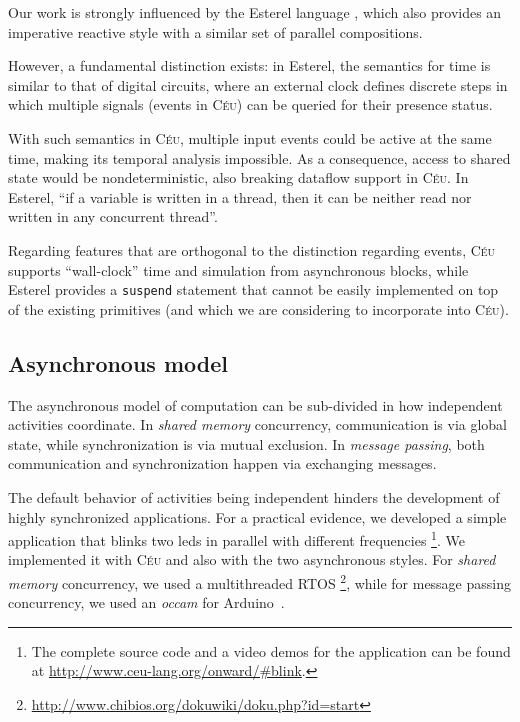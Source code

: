 \documentclass{sigplan-proc}
\newcommand{\2}{\;\;}
\newcommand{\5}{\;\;\;\;\;}
\newcommand{\CEU}{\textsc{C\'{e}u}}
\newcommand{\code}[1] {{\small{\texttt{#1}}}}
\begin{document}
Our work is strongly influenced by the Esterel language \cite{esterel.design}, 
which also provides an imperative reactive style with a similar set of parallel 
compositions.

However, a fundamental distinction exists: in Esterel, the semantics for time 
is similar to that of digital circuits, where an external clock defines 
discrete steps in which multiple signals (events in \CEU{}) can be queried for 
their presence status.

With such semantics in \CEU{}, multiple input events could be active at the 
same time, making its temporal analysis impossible.
As a consequence, access to shared state would be nondeterministic, also 
breaking dataflow support in \CEU{}.
In Esterel, ``if a variable is written in a thread, then it can be neither read 
nor written in any concurrent thread''.~\cite{esterel.primer}

Regarding features that are orthogonal to the distinction regarding events, 
\CEU{} supports ``wall-clock'' time and simulation from asynchronous blocks, 
while Esterel provides a \code{suspend} statement that cannot be easily 
implemented on top of the existing primitives (and which we are considering to 
incorporate into \CEU).

\subsection{Asynchronous model}

The asynchronous model of computation can be sub-divided in how independent 
activities coordinate.
In \emph{shared memory} concurrency, communication is via global state, while 
synchronization is via mutual exclusion.
In \emph{message passing}, both communication and synchronization happen via 
exchanging messages.

The default behavior of activities being independent hinders the development of 
highly synchronized applications.
For a practical evidence, we developed a simple application that blinks two 
leds in parallel with different frequencies%
\footnote{The complete source code and a video demos for the application can be 
found at \url{http://www.ceu-lang.org/onward/\#blink}.}.
We implemented it with \CEU{} and also with the two asynchronous styles.
For \emph{shared memory} concurrency, we used a multithreaded RTOS%
\footnote{\url{http://www.chibios.org/dokuwiki/doku.php?id=start}}, while for 
message passing concurrency, we used an \emph{occam} for 
Arduino~\cite{arduino.occam}.
\end{document}
